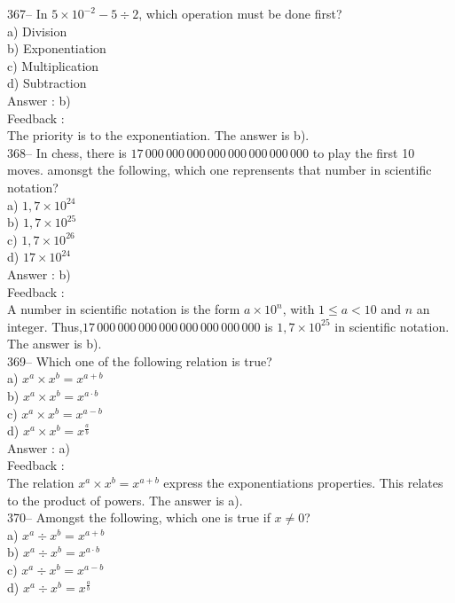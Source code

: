 ﻿\documentclass[letterpaper, 12pt]{article}
\begin{document}
367-- In $5\times10^{-2}-5\div2$, which operation must be done first?\\
a) Division\\
b) Exponentiation\\
c) Multiplication\\
d) Subtraction\\

Answer : b)\\

Feedback : \\
The priority is to the exponentiation. The answer is b).\\

368-- In chess, there is $17\,000\,000\,000\,000\,000\,000\,000\,000$
to play the first 10 moves.  amonsgt the following, which one reprensents that number in scientific notation?\\
a) $1,7\times10^{24}$\\
b) $1,7\times10^{25}$\\
c) $1,7\times10^{26}$\\
d) $17\times10^{24}$\\

Answer : b)\\

Feedback : \\
A number in scientific notation is the form $a\times10^{n}$, with
$1\leq a<10$ and $n$ an integer.  
Thus,$17\,000\,000\,000\,000\,000\,000\,000\,000$ is $1,7\times10^{25}$ in scientific notation. The answer is b).\\

369--  Which one of the following relation is true?\\
a) $x^{a}\times x^{b}=x^{a+b}$\\
b) $x^{a}\times x^{b}=x^{a\cdot b}$\\
c) $x^{a}\times x^{b}=x^{a-b}$\\
d) $x^{a}\times x^{b}=x^{\frac{a}{b}}$\\

Answer : a)\\

Feedback : \\
The relation $x^{a}\times x^{b}=x^{a+b}$ express the exponentiations properties. 
This relates to the product of powers.  
The answer is a).\\

370--  Amongst the following, which one is true if $x \neq 0$?\\
a) $x^{a}\div x^{b}=x^{a+b}$\\
b) $x^{a}\div x^{b}=x^{a\cdot b}$\\
c) $x^{a}\div x^{b}=x^{a-b}$\\
d) $x^{a}\div x^{b}=x^{\frac{a}{b}}$\\
\end{document}
